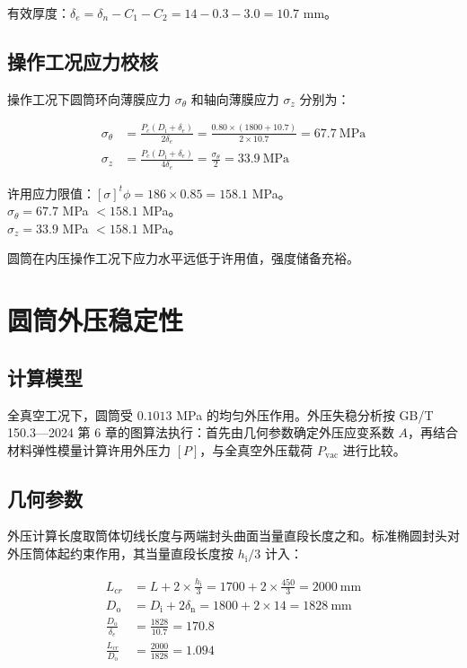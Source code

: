 有效厚度：$\delta_e = \delta_n - C_1 - C_2 = 14 - 0.3 - 3.0 = 10.7$ mm。

\subsection{操作工况应力校核}

操作工况下圆筒环向薄膜应力 $\sigma_\theta$ 和轴向薄膜应力 $\sigma_z$ 分别为：

\begin{align}
\sigma_\theta &= \frac{P_c (D_{\mathrm{i}} + \delta_e)}{2\delta_e}
               = \frac{0.80 \times (1800 + 10.7)}{2 \times 10.7}
               = 67.7\ \text{MPa} \\
\sigma_z     &= \frac{P_c (D_{\mathrm{i}} + \delta_e)}{4\delta_e}
               = \frac{\sigma_\theta}{2}
               = 33.9\ \text{MPa}
\end{align}

许用应力限值：$[\sigma]^t \phi = 186 \times 0.85 = 158.1$ MPa。\\
$\sigma_\theta = 67.7$ MPa $ < 158.1$ MPa。\\
$\sigma_z = 33.9$ MPa $ < 158.1$ MPa。

圆筒在内压操作工况下应力水平远低于许用值，强度储备充裕。

\section{圆筒外压稳定性}
\label{sec:ext-pressure}

\subsection{计算模型}

全真空工况下，圆筒受 $0.1013$ MPa 的均匀外压作用。外压失稳分析按 GB/T 150.3—2024 第 6 章的图算法执行\cite{gbt150-2024}：首先由几何参数确定外压应变系数 $A$，再结合材料弹性模量计算许用外压力 $[P]$，与全真空外压载荷 $P_{\text{vac}}$ 进行比较。

\subsection{几何参数}

外压计算长度取筒体切线长度与两端封头曲面当量直段长度之和。标准椭圆封头对外压筒体起约束作用，其当量直段长度按 $h_{\mathrm{i}}/3$ 计入\cite{guocheng2020}：

\begin{align}
L_{cr} &= L + 2 \times \frac{h_{\mathrm{i}}}{3} = 1700 + 2 \times \frac{450}{3} = 2000\ \text{mm} \\
D_{\mathrm{o}}    &= D_{\mathrm{i}} + 2\delta_{\mathrm{n}} = 1800 + 2 \times 14 = 1828\ \text{mm} \\
\frac{D_{\mathrm{o}}}{\delta_e} &= \frac{1828}{10.7} = 170.8 \\
\frac{L_{cr}}{D_{\mathrm{o}}} &= \frac{2000}{1828} = 1.094
\end{align}

